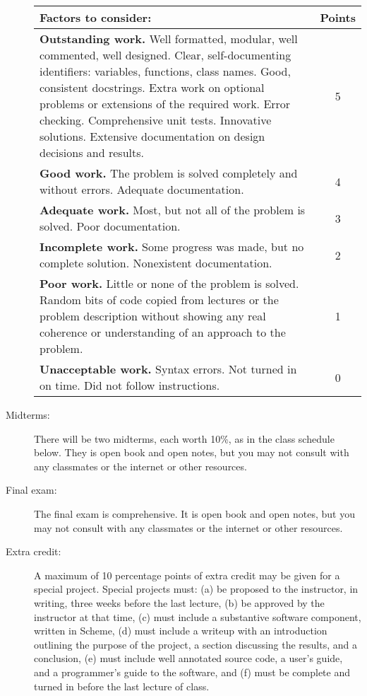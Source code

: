 \documentclass{article}
\begin{document}
\begin{description}
\begin{tabular}{p{}|c}
\bf Factors to consider: & \bf Points \\\hline
{\bf Outstanding work.}    Well formatted, modular,
well commented, well designed.  
Clear, self-documenting identifiers: variables, functions, class names.
Good, consistent docstrings.
 Extra work on optional problems or extensions
of the required work.  Error checking.  Comprehensive unit tests. Innovative solutions.
Extensive documentation on design decisions and results.
 & 5 \\\hline
{\bf Good work.}  The problem is solved completely and without errors.
Adequate documentation.
 & 4 \\\hline
{\bf Adequate work.}  Most, but not all of the problem is solved.  Poor documentation.
 & 3 \\\hline
 {\bf Incomplete work.}  Some progress was made, but no complete solution.
 Nonexistent documentation.
 & 2 \\\hline
{\bf Poor work.}  Little or none of the problem is solved.  Random bits of code copied
from lectures or the problem description without showing any real coherence
or understanding of an approach to the problem.
 & 1 \\\hline
{\bf Unacceptable work.}
 Syntax errors.  Not turned in on time.  Did not follow instructions. & 0 \\
\end{tabular}
\item[Midterms:]  There will be two midterms, each worth 10\%, as
in the class schedule below.   They is open
book and open notes, but you may not consult with any classmates
or the internet or other resources.


\item[Final exam:]  The final exam is comprehensive.  It is open
book and open notes, but you may not consult with any classmates
or the internet or other resources.



\item[Extra credit:] A maximum of 10 percentage points of extra
credit may be given for a special project.  Special projects must: (a)
be proposed to the instructor, in writing, three weeks before the last
lecture, (b) be approved by the instructor at that time, (c) must
include a substantive software component, written in Scheme, (d) must
include a writeup with an introduction outlining the purpose of the
project, a section discussing the results, and a conclusion,
(e) must include well annotated source code, a user's guide, and a
programmer's guide to the software, and (f) must be complete and
turned in before the last lecture of class.


\end{description}
\end{document}
